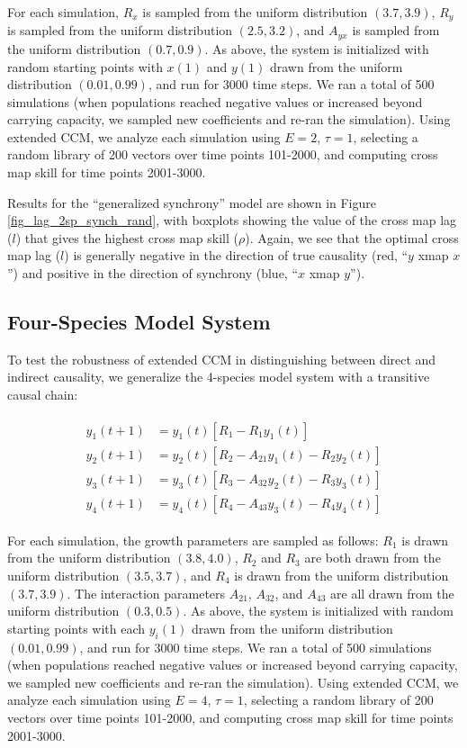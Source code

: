 For each simulation, $R_x$ is sampled from the uniform distribution $(3.7, 3.9)$, $R_y$ is sampled from the uniform distribution $(2.5, 3.2)$, and $A_{yx}$ is sampled from the uniform distribution $(0.7, 0.9)$. As above, the system is initialized with random starting points with $x(1)$ and $y(1)$ drawn from the uniform distribution $(0.01, 0.99)$, and run for 3000 time steps. We ran a total of 500 simulations (when populations reached negative values or increased beyond carrying capacity, we sampled new coefficients and re-ran the simulation). Using extended CCM, we analyze each simulation using $E = 2$, $\tau = 1$, selecting a random library of 200 vectors over time points 101-2000, and computing cross map skill for time points 2001-3000.

Results for the ``generalized synchrony'' model are shown in Figure \ref{fig_lag_2sp_synch_rand}, with boxplots showing the value of the cross map lag ($l$) that gives the highest cross map skill ($\rho$). Again, we see that the optimal cross map lag ($l$) is generally negative in the direction of true causality (red, ``$y$ xmap $x$'') and positive in the direction of synchrony (blue, ``$x$ xmap $y$''). 

\subsection{Four-Species Model System}

To test the robustness of extended CCM in distinguishing between direct and indirect causality, we generalize the 4-species model system with a transitive causal chain:

\begin{align}
\label{eqn_4sp_transitive_rand}
\begin{split}
y_1(t+1) &= y_1(t) \left[R_1 - R_1 y_1(t)\right]\\
y_2(t+1) &= y_2(t) \left[R_2 - A_{21} y_1(t) - R_2 y_2(t)\right]\\
y_3(t+1) &= y_3(t) \left[R_3 - A_{32} y_2(t) - R_3 y_3(t)\right]\\
y_4(t+1) &= y_4(t) \left[R_4 - A_{43} y_3(t) - R_4 y_4(t)\right]
\end{split}
\end{align}

For each simulation, the growth parameters are sampled as follows: $R_1$ is drawn from the uniform distribution $(3.8, 4.0)$, $R_2$ and $R_3$ are both drawn from the uniform distribution $(3.5, 3.7)$, and $R_4$ is drawn from the uniform distribution $(3.7, 3.9)$. The interaction parameters $A_{21}$, $A_{32}$, and $A_{43}$ are all drawn from the uniform distribution $(0.3, 0.5)$. As above, the system is initialized with random starting points with each $y_i(1)$ drawn from the uniform distribution $(0.01, 0.99)$, and run for 3000 time steps. We ran a total of 500 simulations (when populations reached negative values or increased beyond carrying capacity, we sampled new coefficients and re-ran the simulation). Using extended CCM, we analyze each simulation using $E = 4$, $\tau = 1$, selecting a random library of 200 vectors over time points 101-2000, and computing cross map skill for time points 2001-3000.

